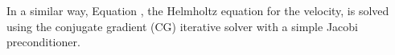 \documentclass{sig-alternate}
\begin{document}
In a similar way, Equation , the Helmholtz equation for the velocity, is solved using the conjugate gradient (CG) iterative solver with a simple Jacobi preconditioner.

\end{document}
